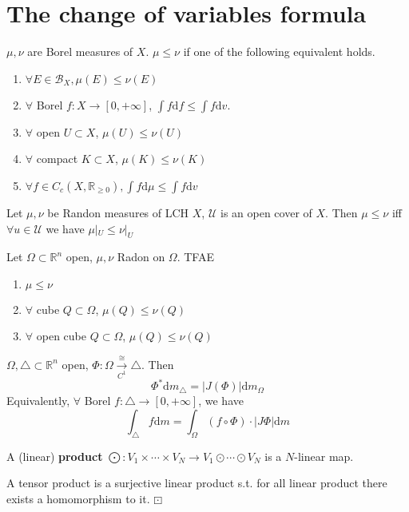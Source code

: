 \section{The change of variables formula}
\begin{definition}
     $ \mu,\nu $ are Borel measures of  $ X  $.  $ \mu \leq \nu $ if one of the following equivalent holds.
     \begin{enumerate}
        \item  $ \forall E\in \mathcal{B}_X,\mu(E ) \leq \nu(E) $
        \item  $ \forall  $ Borel  $ f:X\rightarrow [0,+\infty] $,  $ \int f\mathrm{d}f \leq \int f\mathrm{d}v $.
        \item  $ \forall  $ open  $ U\subset X $,  $ \mu(U) \leq \nu(U) $
        \item  $ \forall $ compact  $ K\subset X $,  $ \mu(K)  \leq \nu(K)$
        \item  $ \forall f\in C_c(X,\mathbb{R}_{ \geq 0}),\int f\mathrm{d}\mu \leq \int f\mathrm{d}v $        
     \end{enumerate}  
\end{definition}
\begin{proposition}
    Let  $ \mu,\nu $  be Randon measures of LCH  $ X  $,  $ \mathcal{U} $ is an open cover of  $ X $. Then  $ \mu \leq \nu $ iff  $ \forall u\in \mathcal{U} $ we have  $ \mu|_U \leq \nu|_U $    
\end{proposition}
\begin{proposition}
    Let  $ \Omega\subset \mathbb{R}^n $ open,  $ \mu,\nu  $ Radon on  $ \Omega $. TFAE
    \begin{enumerate}
        \item  $ \mu \leq \nu $
        \item  $ \forall  $ cube  $ Q\subset \Omega $,  $ \mu(Q) \leq \nu(Q) $
        \item  $ \forall  $ open cube  $ Q\subset \Omega $,  $ \mu(Q) \leq \nu(Q) $     
    \end{enumerate}  
\end{proposition}
\begin{theorem}
     $ \Omega,\triangle\subset \mathbb{R}^n $ open,  $ \Phi:\Omega\xrightarrow[C^1]{\cong}\triangle $. Then \[\Phi^*\mathrm{d}m_{\triangle}=|J(\Phi)|\mathrm{d}m_{\Omega} \]
     Equivalently,  $ \forall  $ Borel  $ f:\triangle\rightarrow[0,+\infty] $, we have 
     \[\int_{\triangle}f\mathrm{d}m=\int_{\Omega}(f\circ \Phi)\cdot|J\Phi|\mathrm{d}m\]   
\end{theorem}
\begin{definition}
    A (linear) \textbf{product}  $ \bigodot:V_1\times\cdots\times V_N\rightarrow V_1\odot\cdots\odot V_N $ is a  $ N $-linear map.  
\end{definition}
\begin{definition}
    A tensor product is a surjective linear product s.t.  for all linear product there exists a homomorphism to it.  $ \boxdot $ 
\end{definition}